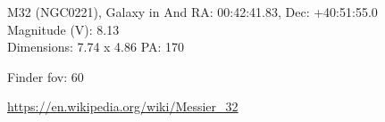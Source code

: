 \begin{block}{M32 (NGC0221), Galaxy in And}
    RA: 00:42:41.83, Dec: +40:51:55.0 \\ 
    Magnitude (V): 8.13 \\ 
    Dimensions: 7.74 x 4.86 PA: 170 

    Finder fov: 60 

    \url{https://en.wikipedia.org/wiki/Messier_32} 
\end{block}